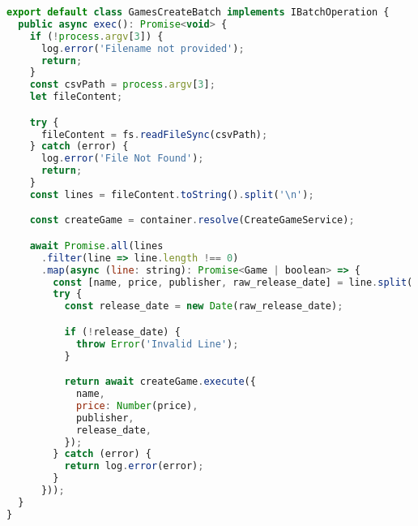 \begin{lstlisting}[language=JavaScript, caption={Caso de Uso reaproveitado para processamento de arquivos},captionpos=b, label=alg:gamescreatebatch]
export default class GamesCreateBatch implements IBatchOperation {
  public async exec(): Promise<void> {
    if (!process.argv[3]) {
      log.error('Filename not provided');
      return;
    }
    const csvPath = process.argv[3];
    let fileContent;

    try {
      fileContent = fs.readFileSync(csvPath);
    } catch (error) {
      log.error('File Not Found');
      return;
    }
    const lines = fileContent.toString().split('\n');

    const createGame = container.resolve(CreateGameService);

    await Promise.all(lines
      .filter(line => line.length !== 0)
      .map(async (line: string): Promise<Game | boolean> => {
        const [name, price, publisher, raw_release_date] = line.split(',');
        try {
          const release_date = new Date(raw_release_date);

          if (!release_date) {
            throw Error('Invalid Line');
          }

          return await createGame.execute({
            name,
            price: Number(price),
            publisher,
            release_date,
          });
        } catch (error) {
          return log.error(error);
        }
      }));
  }
}
\end{lstlisting}